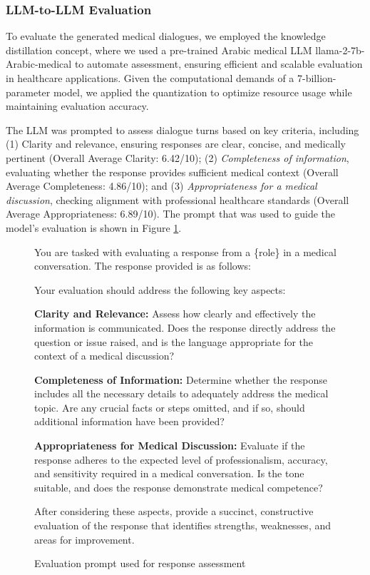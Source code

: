 \documentclass[manuscript,screen,review]{acmart}
\begin{document}

\subsubsection{LLM-to-LLM Evaluation}
To evaluate the generated medical dialogues, we employed the knowledge distillation concept, where we used a pre-trained Arabic medical LLM llama-2-7b-Arabic-medical \cite{engtig2025llama2arabicmedical} to automate assessment, ensuring efficient and scalable evaluation in healthcare applications. Given the computational demands of a 7-billion-parameter model, we applied the quantization to optimize resource usage while maintaining evaluation accuracy.

 The LLM was prompted to assess dialogue turns based on key criteria, including (1) Clarity and relevance, ensuring responses are clear, concise, and medically pertinent (Overall Average Clarity: 6.42/10); (2) \textit{Completeness of information}, evaluating whether the response provides sufficient medical context (Overall Average Completeness: 4.86/10); and (3) \textit{Appropriateness for a medical discussion}, checking alignment with professional healthcare standards (Overall Average Appropriateness: 6.89/10).  
The prompt that was used to guide the model's evaluation is shown in Figure \ref{fig:evaluationprompt}.
\begin{figure}[ht]
\centering
\begin{tcolorbox}[
  colback=black!5!white,
  colframe=black,
  fonttitle=\bfseries,
  title=Prompt,
  arc=5pt,
  boxrule=0.8pt,
  fontupper=\small, %
  width=\textwidth,
]
You are tasked with evaluating a response from a \{role\} in a medical conversation. The response provided is as follows:

Your evaluation should address the following key aspects:

\textbf{Clarity and Relevance:} Assess how clearly and effectively the information is communicated. Does the response directly address the question or issue raised, and is the language appropriate for the context of a medical discussion?

\textbf{Completeness of Information:} Determine whether the response includes all the necessary details to adequately address the medical topic. Are any crucial facts or steps omitted, and if so, should additional information have been provided?

\textbf{Appropriateness for Medical Discussion:} Evaluate if the response adheres to the expected level of professionalism, accuracy, and sensitivity required in a medical conversation. Is the tone suitable, and does the response demonstrate medical competence?

After considering these aspects, provide a succinct, constructive evaluation of the response that identifies strengths, weaknesses, and areas for improvement.
\end{tcolorbox}
\caption{Evaluation prompt used for response assessment}
\label{fig:evaluationprompt}
\end{figure}
\end{document}
